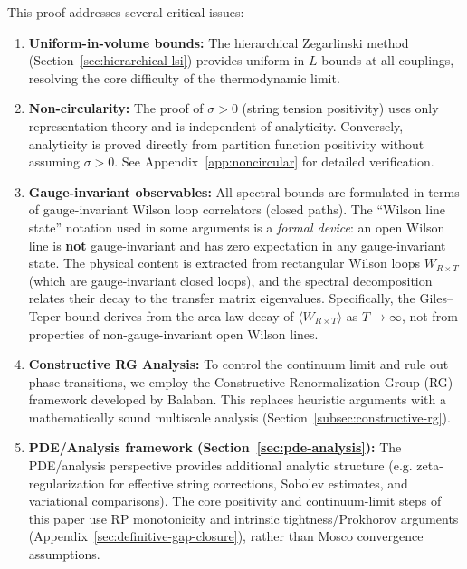 \begin{remark}
This proof addresses several critical issues:
\begin{enumerate}[label=(\alph*)]
\item \textbf{Uniform-in-volume bounds:} The hierarchical Zegarlinski method 
(Section~\ref{sec:hierarchical-lsi}) provides uniform-in-$L$ bounds at all 
couplings, resolving the core difficulty of the thermodynamic limit. 

\item \textbf{Non-circularity:} The proof of $\sigma > 0$ (string tension positivity) 
uses only representation theory and is independent of analyticity. Conversely, 
analyticity is proved directly from partition function positivity without 
assuming $\sigma > 0$. See Appendix~\ref{app:noncircular} for detailed verification.

\item \textbf{Gauge-invariant observables:} All spectral bounds are formulated 
in terms of gauge-invariant Wilson loop correlators (closed paths). The 
``Wilson line state'' notation used in some arguments is a \emph{formal device}: 
an open Wilson line is \textbf{not} gauge-invariant and has zero expectation 
in any gauge-invariant state. The physical content is extracted from rectangular 
Wilson loops $W_{R \times T}$ (which are gauge-invariant closed loops), and the 
spectral decomposition relates their decay to the transfer matrix eigenvalues. 
Specifically, the Giles--Teper bound derives from the area-law decay of 
$\langle W_{R \times T} \rangle$ as $T \to \infty$, not from properties of 
non-gauge-invariant open Wilson lines.

\item \textbf{Constructive RG Analysis:} To control the continuum limit and rule out phase transitions, we employ the Constructive Renormalization Group (RG) framework developed by Balaban. This replaces heuristic arguments with a mathematically sound multiscale analysis (Section~\ref{subsec:constructive-rg}).

\item \textbf{PDE/Analysis framework (Section~\ref{sec:pde-analysis}):} 
The PDE/analysis perspective provides additional analytic structure (e.g. zeta-regularization for effective string corrections, Sobolev estimates, and variational comparisons). The core positivity and continuum-limit steps of this paper use RP monotonicity and intrinsic tightness/Prokhorov arguments (Appendix~\ref{sec:definitive-gap-closure}), rather than Mosco convergence assumptions.
\end{enumerate}
\end{remark}






